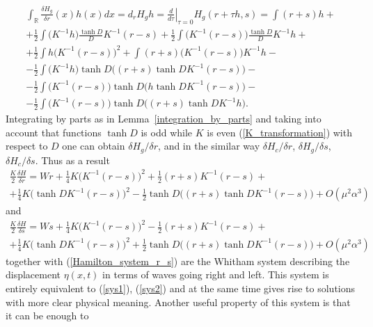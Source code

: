\begin{multline*}
	\int _{\mathbb R} \frac{\delta H_g}{\delta r} (x)h(x) dx
	=
	d_r H_g h
	=
	\left. \frac{d}{d\tau} \right| _{\tau = 0} H_g( r + \tau h, s )
	=
	\int (r + s)h
	+
	\\
	+
	\frac 12 \int \big( K^{-1} h \big) \frac{\tanh D}{D} K^{-1} (r - s)
	+
	\frac 12 \int \big( K^{-1} (r - s) \big) \frac{\tanh D}{D} K^{-1} h
	+	
	\\
	+
	\frac 12 \int h	\big( K^{-1} (r - s) \big) ^2
	+
	\int (r + s) \big( K^{-1} (r - s) \big) K^{-1} h
	-
	\\
	-
	\frac 12 \int \big( K^{-1} h \big)
	\tanh{D} \big( (r + s) \tanh{D} K^{-1} (r - s) \big)
	-
	\\
	-
	\frac 12 \int \big( K^{-1} (r - s) \big)
	\tanh{D} \big( h \tanh{D} K^{-1} (r - s) \big)
	-
	\\
	-
	\frac 12 \int \big( K^{-1} (r - s) \big)
	\tanh{D} \big( (r + s) \tanh{D} K^{-1} h \big)
	.
\end{multline*}
%
Integrating by parts as in Lemma~{\ref{integration_by_parts}}
and taking into account that functions $\tanh D$ is odd while
$K$ is even (\ref{K_transformation}) with respect to $D$
one can obtain ${\delta H_g}/{\delta r}$,
and in the similar way ${\delta H_c}/{\delta r}$, ${\delta H_g}/{\delta s}$,
${\delta H_c}/{\delta s}$.
Thus as a result
%
\begin{multline}
\label{right_variational_derivative}
	\frac{K}{2} \frac{\delta H}{\delta r}
	=
	Wr + \frac 14 K \big( K^{-1} (r - s) \big)^2 +
	\frac 12 (r + s) K^{-1} (r - s)
	+
	\\
	+
	\frac 14 K \big( \tanh D K^{-1} (r - s) \big)^2 -
	\frac 12 \tanh D \big( (r + s) \tanh D K^{-1} (r - s) \big)
	+ O(\mu^2 \alpha^3)
\end{multline}
%
and
%
\begin{multline}
\label{left_variational_derivative}
	\frac{K}{2} \frac{\delta H}{\delta s}
	=
	Ws + \frac 14 K \big( K^{-1} (r - s) \big)^2 -
	\frac 12 (r + s) K^{-1} (r - s)
	+
	\\
	+
	\frac 14 K \big( \tanh D K^{-1} (r - s) \big)^2 +
	\frac 12 \tanh D \big( (r + s) \tanh D K^{-1} (r - s) \big)
	+ O(\mu^2 \alpha^3)
\end{multline}
%
together with (\ref{Hamilton_system_r_s}) are the Whitham system
describing the displacement $\eta(x, t)$ in terms of waves going
right and left.
This system is entirely equivalent to (\ref{sys1}), (\ref{sys2})
and at the same time gives rise to solutions with more clear physical meaning.
Another useful property of this system is that it can be enough to

